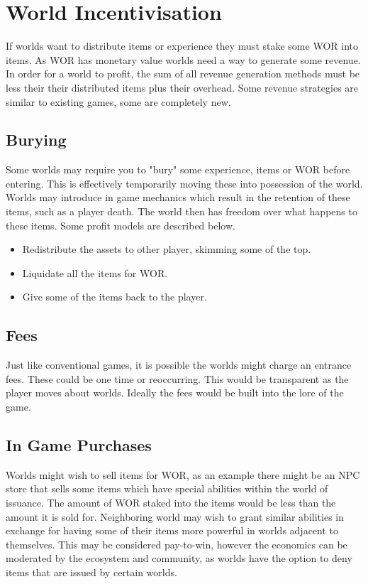 \documentclass[runningheads,a4paper]{llncs}
\begin{document}
\section{World Incentivisation}
\label{MakeMoney}
If worlds want to distribute items or experience they must stake some WOR into items. As WOR has monetary value worlds need a way to generate some revenue. In order for a world to profit, the sum of all revenue generation methods must be less their their distributed items plus their overhead. Some revenue strategies are similar to existing games, some are completely new. 

\subsection{Burying}
\label{Burying}
Some worlds may require you to "bury" some experience, items or WOR before entering. This is effectively temporarily moving these into possession of the world. Worlds may introduce in game mechanics which result in the retention of these items, such as a player death. The world then has freedom over what happens to these items. Some profit models are described below.

\begin{itemize}
\item{Redistribute the assets to other player, skimming some of the top.}
\item{Liquidate all the items for WOR.}
\item{Give some of the items back to the player.}
\end{itemize}

\subsection{Fees}
Just like conventional games, it is possible the worlds might charge an entrance fees. These could be one time or reoccurring. This would be transparent as the player moves about worlds. Ideally the fees would be built into the lore of the game.

\subsection{In Game Purchases}
Worlds might wish to sell items for WOR, as an example there might be an NPC store that sells some items which have special abilities within the world of issuance. The amount of WOR staked into the items would be less than the amount it is sold for. Neighboring world may wish to grant similar abilities in exchange for having some of their items more powerful in worlds adjacent to themselves. This may be considered pay-to-win, however the economics can be moderated by the ecosystem and community, as worlds have the option to deny items that are issued by certain worlds.\\
\end{document}
